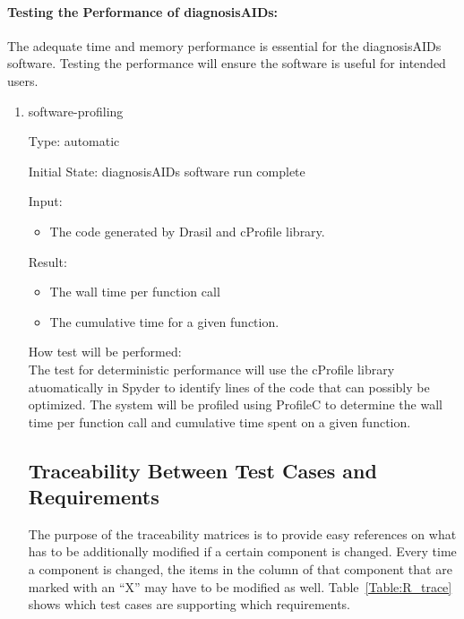 \documentclass[12pt, titlepage]{article}
\begin{document}
\begin{enumerate}
\paragraph{Testing the Performance of diagnosisAIDs:}

The adequate time and memory performance is essential for the diagnosisAIDs 
software. Testing the performance will ensure the software is useful for 
intended users. 

\begin{enumerate}

\item{software-profiling\\}

Type: automatic
					
Initial State: diagnosisAIDs software run complete
					
Input:
\begin{itemize} %
\item The code generated by Drasil and cProfile library.
\end{itemize}

Result: 
\begin{itemize}
\item The wall time per function call
\item The cumulative time for a given function.
\end{itemize}
				
					
How test will be performed: \\
The test for deterministic performance will use the cProfile library 
atuomatically in Spyder to identify lines of the code that can possibly be 
optimized. The system will be profiled using ProfileC to determine the wall time 
per function call and cumulative time spent on a given function.\\


\subsection{Traceability Between Test Cases and Requirements}

The purpose of the traceability matrices is to provide easy references on what
has to be additionally modified if a certain component is changed.  Every time a
component is changed, the items in the column of that component that are marked
with an ``X'' may have to be modified as well.  Table~\ref{Table:R_trace} shows 
which test cases are supporting which requirements.



\end{enumerate}
\end{enumerate}
\end{document}

